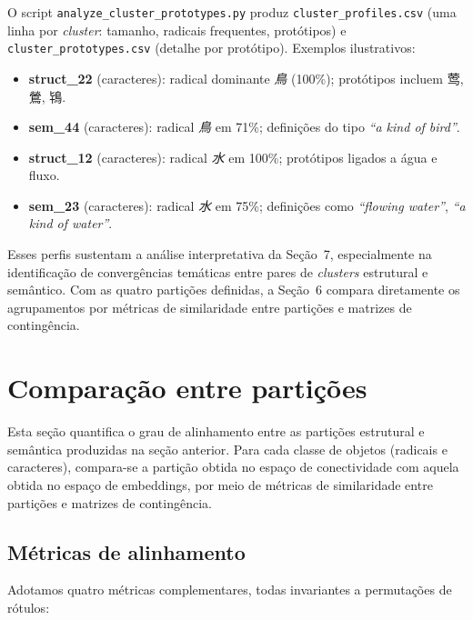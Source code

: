 \documentclass[10pt, a4paper, titlepage]{extarticle}
\begin{document}
O script \texttt{analyze\_cluster\_prototypes.py} produz
\texttt{cluster\_profiles.csv} (uma linha por \emph{cluster}: tamanho,
radicais frequentes, protótipos) e \texttt{cluster\_prototypes.csv}
(detalhe por protótipo). Exemplos ilustrativos:

\begin{itemize}
    \item \textbf{struct\_22} (caracteres): radical dominante \textit{鳥}
          (100\%); protótipos incluem 莺, 鶯, 鴇.
    \item \textbf{sem\_44} (caracteres): radical \textit{鳥} em 71\%;
          definições do tipo \emph{``a kind of bird''}.
    \item \textbf{struct\_12} (caracteres): radical \textit{水} em 100\%;
          protótipos ligados a água e fluxo.
    \item \textbf{sem\_23} (caracteres): radical \textit{水} em 75\%;
          definições como \emph{``flowing water''}, \emph{``a kind of water''}.
\end{itemize}

Esses perfis sustentam a análise interpretativa da Seção~7, especialmente
na identificação de convergências temáticas entre pares de \emph{clusters}
estrutural e semântico. Com as quatro partições definidas, a Seção~6
compara diretamente os agrupamentos por métricas de similaridade entre
partições e matrizes de contingência.

\section{Comparação entre partições}
Esta seção quantifica o grau de alinhamento entre as partições estrutural e semântica produzidas na seção anterior. Para cada classe de objetos (radicais e caracteres), compara-se a partição obtida no espaço de conectividade com aquela obtida no espaço de embeddings, por meio de métricas de similaridade entre partições e matrizes de contingência.

\subsection{Métricas de alinhamento}
Adotamos quatro métricas complementares, todas invariantes a permutações de rótulos:
\end{document}
